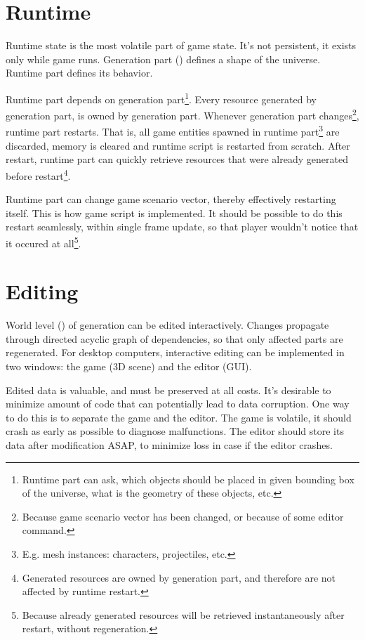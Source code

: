 \documentclass[12pt]{article}
\begin{document}
\section{Runtime}

Runtime state is the most volatile part of game state.
It's not persistent, it exists only while game runs.
Generation part () defines a shape of the universe.
Runtime part defines its behavior.

Runtime part depends on generation part\footnote{
    Runtime part can ask, which objects should be placed in given
    bounding box of the universe, what is the geometry of these objects,
    etc.
}.
Every resource generated by generation part, is owned by generation part.
Whenever generation part changes\footnote{
    Because game scenario vector has been changed, or
    because of some editor command.
}, runtime part restarts.
That is, all game entities spawned in runtime part\footnote{
    E.g. mesh instances: characters, projectiles, etc.
} are discarded, memory is cleared and runtime script is restarted from scratch.
After restart, runtime part can quickly retrieve resources that were
already generated before restart\footnote{
    Generated resources are owned by generation part, and therefore are
    not affected by runtime restart.
}.

Runtime part can change game scenario vector, thereby effectively
restarting itself.
This is how game script is implemented.
It should be possible to do this restart seamlessly, within single frame update,
so that player wouldn't notice that it occured at all\footnote{
    Because already generated resources will be retrieved instantaneously
    after restart, without regeneration.
}.

\section{Editing}

World level () of generation can be edited
interactively.
Changes propagate through directed acyclic graph of dependencies, so
that only affected parts are regenerated.
For desktop computers, interactive editing can be implemented in two
windows: the game (3D scene) and the editor (GUI).

Edited data is valuable, and must be preserved at all costs.
It's desirable to minimize amount of code that can potentially lead to
data corruption.
One way to do this is to separate the game and the editor.
The game is volatile, it should crash as early as possible to diagnose
malfunctions.
The editor should store its data after modification ASAP, to minimize loss
in case if the editor crashes.
\end{document}
